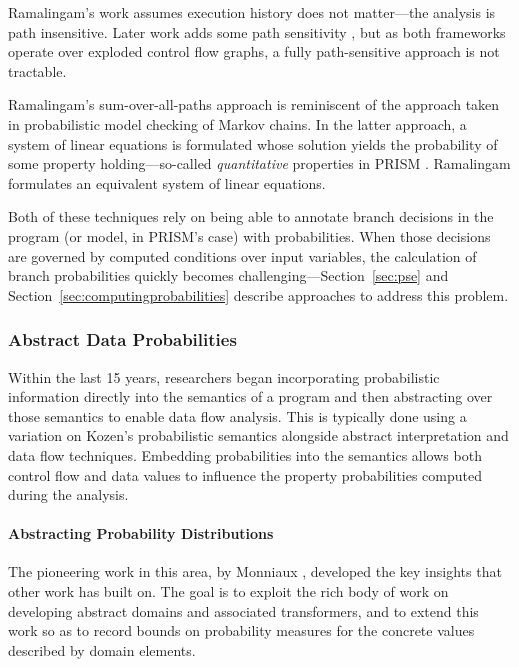 Ramalingam's work assumes execution history does not 
matter---the analysis is path insensitive.
Later work adds some path sensitivity \cite{mehofer2001novel}, 
but as both frameworks operate over exploded control flow graphs, a fully 
path-sensitive approach is not tractable.

Ramalingam's sum-over-all-paths approach is reminiscent of
the approach taken in probabilistic model checking of Markov chains.
In the latter approach, a system of linear equations is formulated
whose solution yields the probability of some property
holding---so-called \textit{quantitative} properties in 
PRISM \cite{kwiatkowska2010advances}.   Ramalingam formulates an
equivalent system of linear equations.  

Both of these techniques rely on being able to annotate
branch decisions in the program (or model, in PRISM's case)
with probabilities.  When those decisions are governed by
computed conditions over input variables, the calculation of
branch probabilities quickly becomes challenging---Section~\ref{sec:pse} 
and Section~\ref{sec:computingprobabilities} describe approaches
to  address this problem.


\subsubsection{Abstract Data Probabilities}
Within the last 15 years, researchers 
began incorporating probabilistic information directly into
the semantics of a program and then abstracting over 
those semantics 
\cite{monniaux2000abstract,smith2008probabilistic,cousot2012probabilistic}
to enable data flow analysis.
This is typically done using a variation on Kozen's 
probabilistic semantics \cite{kozen1981semantics} 
alongside abstract interpretation and data flow techniques.
Embedding probabilities into the semantics allows 
both control flow and data values to influence
the property probabilities computed during the analysis.

\paragraph{Abstracting Probability Distributions}
The pioneering work in this area, by 
Monniaux \cite{monniaux2000abstract,monniaux2001backwards},
developed the key insights that other work has built on. 
The goal is to exploit the rich body of work on developing
abstract domains and associated transformers, and to extend this work 
so as to record bounds on probability measures for the concrete values
described by domain elements.

